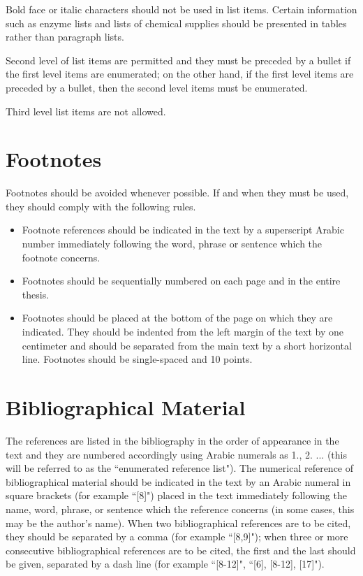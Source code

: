 \documentclass[a4paper,oneside,12pt]{report}
\numberwithin{equation}{chapter}
\begin{document}
Bold face or italic characters should not be used in list items. Certain information such as enzyme lists and lists of chemical supplies should be presented in tables rather than paragraph lists.

Second level of list items are permitted and they must be preceded by a bullet if the first level items are enumerated; on the other hand, if the first level items are preceded by a bullet, then the second level items must be enumerated.

Third level list items are not allowed.


\section{Footnotes}

Footnotes should be avoided whenever possible. If and when they must be used, they should comply with the following rules.
\begin{itemize}
\item Footnote references should be indicated in the text by a superscript Arabic number immediately following the word, phrase or sentence which the footnote concerns.
\item Footnotes should be sequentially numbered on each page and in the entire thesis.
\item Footnotes should be placed at the bottom of the page on which they are indicated. They should be indented from the left margin of the text by one centimeter and should be separated from the main text by a short horizontal line. Footnotes should be single-spaced and 10 points.
\end{itemize}


\section{Bibliographical Material}

The references are listed in the bibliography in the order of appearance in the text and they are numbered accordingly using Arabic numerals as 1., 2. ... (this will be referred to as the ``enumerated reference list"). The numerical reference of bibliographical material should be indicated in the text by an Arabic numeral in square brackets (for example ``[8]") placed in the text immediately following the name, word, phrase, or sentence
which the reference concerns (in some cases, this may be the author's
name). When two bibliographical references are to be cited, they should be separated by a comma (for example ``[8,9]"); when three or more consecutive
bibliographical references are to be cited, the first and the last should be given, separated by a dash line (for example ``[8-12]", ``[6], [8-12], [17]").
\end{document}
